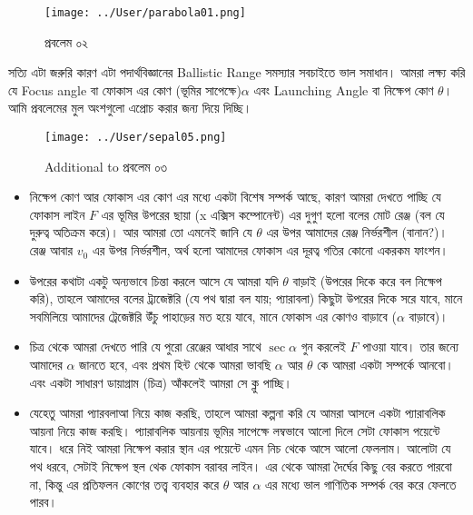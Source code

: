 \documentclass[12pt,a4paper]{article}
\begin{document}
\begin{figure}[hbtp]
\centering
\texttt{[image: ../User/parabola01.png]}
\caption{প্রবলেম ০২}
\end{figure}
সত্যি এটা জরুরি কারণ এটা পদার্থবিজ্ঞানের Ballistic Range সমস্যার সবচাইতে ভাল সমাধান। আমরা লক্ষ্য করি যে {\color{red} Focus angle বা ফোকাস এর কোণ (ভূমির সাপেক্ষে)$\alpha$} এবং {\color{green} Launching Angle বা নিক্ষেপ কোণ $\theta$}। আমি প্রবলেমের মুল অংশগুলো এপ্রোচ করার জন্য দিয়ে দিচ্ছি। 
\begin{figure}[!ht]
\centering
\texttt{[image: ../User/sepal05.png]}
\caption{Additional to প্রবলেম ০৩}
\end{figure}
\begin{itemize}
\item নিক্ষেপ কোণ আর ফোকাস এর কোণ এর মধ্যে একটা বিশেষ সম্পর্ক আছে, কারণ আমরা দেখতে পাচ্ছি যে ফোকাস লাইন $F$ এর ভূমির উপরের ছায়া (x এক্সিস কম্পোনেন্ট) এর দুগুণ হলো বলের মোট রেঞ্জ (বল যে দুরুত্ব অতিক্রম করে)। আর আমরা তো এমনেই জানি যে $\theta$ এর উপর আমাদের রেঞ্জ নির্ভরশীল (বানান?)। রেঞ্জ আবার $v_0$ এর উপর নির্ভরশীল, অর্থ হলো আমাদের ফোকাস এর দূরত্ব গতির কোনো একরকম ফাংশন। 
\item উপরের কথাটা একটু অন্যভাবে চিন্তা করলে আসে যে আমরা যদি $\theta$ বাড়াই (উপরের দিকে করে বল নিক্ষেপ করি), তাহলে আমাদের বলের ট্র্যজেক্টরি (যে পথ দ্বারা বল যায়; প্যারাবলা) কিছুটা উপরের দিকে সরে যাবে, মানে সবমিলিয়ে আমাদের ট্রেজেক্টরি উঁচু পাহাড়ের মত হয়ে যাবে, মানে ফোকাস এর কোণও বাড়াবে ($\alpha$ বাড়াবে)।
\item চিত্র থেকে আমরা দেখতে পারি যে পুরো রেঞ্জের আধার সাথে $\sec \alpha$ গুন করলেই $F$ পাওয়া যাবে। তার জন্যে আমাদের $\alpha$ জানতে হবে, এবং প্রথম হিন্ট থেকে আমরা ভাবছি $\alpha$ আর $\theta$ কে আমরা একটা সম্পর্কে আনবো। এবং একটা সাধারণ ডায়াগ্রাম (চিত্র) আঁকলেই আমরা সে ক্লু পাচ্ছি। 
\item যেহেতু আমরা প্যারবলাআ নিয়ে কাজ করছি, তাহলে আমরা কল্পনা করি যে আমরা আসলে একটা প্যারাবলিক আয়না নিয়ে কাজ করছি। প্যারাবলিক আয়নায় ভূমির সাপেক্ষে লম্বভাবে আলো দিলে সেটা ফোকাস পয়েন্টে যাবে। ধরে নিই আমরা নিক্ষেপ করার স্থান এর পয়েন্টে এমন নিচ থেকে আসে আলো ফেললাম। আলোটা যে পথ ধরবে, সেটাই নিক্ষেপ স্থল থেক ফোকাস বরাবর লাইন। এর থেকে আমরা দৈর্ঘের কিছু বের করতে পারবো না, কিন্তু এর প্রতিফলন কোণের তত্ত্ব ব্যবহার করে $\theta$ আর $\alpha$ এর মধ্যে ভাল গাণিতিক সম্পর্ক বের করে ফেলতে পারব। 
\end{itemize}
\end{document}
